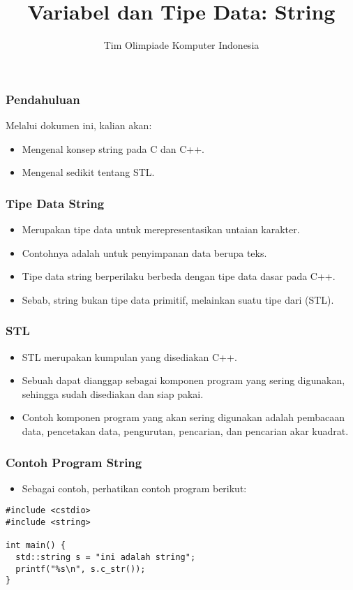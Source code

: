 

\title{Variabel dan Tipe Data: String}
\author{Tim Olimpiade Komputer Indonesia}
\date{}



\begin{frame}
\titlepage
\end{frame}

\begin{frame}
\frametitle{Pendahuluan}
Melalui dokumen ini, kalian akan:
\begin{itemize}
  \item Mengenal konsep string pada C dan C++.
  \item Mengenal sedikit tentang STL.
\end{itemize}
\end{frame}

\begin{frame}[fragile]
\frametitle{Tipe Data String}
\begin{itemize}
  \item Merupakan tipe data untuk merepresentasikan untaian karakter.
  \item Contohnya adalah untuk penyimpanan data berupa teks.
  \item Tipe data string berperilaku berbeda dengan tipe data dasar pada C++.
  \item Sebab, string bukan tipe data primitif, melainkan suatu tipe dari  (STL).
\end{itemize}
\end{frame}

\begin{frame}[fragile]
\frametitle{STL}
\begin{itemize}
  \item STL merupakan kumpulan  yang disediakan C++.
  \item Sebuah  dapat dianggap sebagai komponen program yang sering digunakan, sehingga sudah disediakan dan siap pakai.
  \item Contoh komponen program yang akan sering digunakan adalah pembacaan data, pencetakan data, pengurutan, pencarian, dan pencarian akar kuadrat.
\end{itemize}
\end{frame}

\begin{frame}[fragile]
\frametitle{Contoh Program String}
\begin{itemize}
  \item Sebagai contoh, perhatikan contoh program berikut:
\end{itemize}
\begin{lstlisting}
#include <cstdio>
#include <string>

int main() {
  std::string s = "ini adalah string";
  printf("%s\n", s.c_str());
}\end{lstlisting}
\end{frame}

